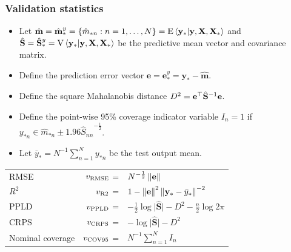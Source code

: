 \documentclass{snedecorbeamer}
\begin{document}
\begin{frame}%
  \label{frm:validation}
  \frametitle{Validation statistics}

  \newcommand{\predmean}{\hat{\mathbf{m}}^{y}_*}
  \newcommand{\predvar}{\hat{\mathbf{S}}^{y}_*}
  \newcommand{\postpred}{\hat{p}^{y}_*}

  \begin{itemize}
  \item   Let
    $\hat{\mathbf{m}} = \predmean = \{\hat{m}_{*n}: n = 1, \dots, N\} =
    \EV{\mathbf{y}_* | \mathbf{y}, \mathbf{X}, \mathbf{X}_*}$
    and
    $\hat{\mathbf{S}} = \predvar = \VV{\mathbf{y}_* |
      \mathbf{y}, \mathbf{X}, \mathbf{X}_*}$
    be the predictive mean vector and covariance matrix.
  \item  Define the
    prediction error vector $\mathbf{e} = \mathbf{e}_{*}^{y} =
    \mathbf{y}_{*} - \hat{\mathbf{m}}$.
  \item Define the square Mahalanobis distance $D^2
    = \mathbf{e}^{\top} \hat{\mathbf{S}}^{-1} \mathbf{e}$.
  \item Define the point-wise 95\% coverage indicator variable
    $I_{n} = 1$ if $y_{*n} \in \hat{m}_{*n} \pm 1.96
    {\hat{S}_{nn}}^{-\frac{1}{2}}$.
  \item   Let $\bar{y}_* = N^{-1} \sum_{n=1}^{N} y_{*n}$ be the test output
    mean.
  \end{itemize}

  \begin{center}
    \begin{tabular}{lrl}
      RMSE
      & $v_{\textsc{RMSE}}$ =
      & $N^{-\frac{1}{2}} \left\lVert\mathbf{e}\right\rVert$ \\
      $R^2$
      & $v_{\textsc{R2}} $ =
      & $1 -%
        \norm{\mathbf{e}}^{2}
        \norm{\mathbf{y}_* - \bar{y}_*}^{-2}$ \\
      PPLD
      & $v_{\textsc{PPLD}}$ =
      & $
        -\frac{1}{2} \log \lvert \hat{\mathbf{S}} \rvert
        -D^2
        -\frac{n}{2} \log 2 \pi
        $
      \\
      CRPS
      & $v_{\textsc{CRPS}}$ =
      & $
        -\log \lvert \hat{\mathbf{S}} \rvert%
        -D^2
        $
      \\
      Nominal coverage
      & $v_{\textsc{COV95}}$ =
      & $N^{-1} \sum_{n = 1}^{N} I_{n}$
    \end{tabular}
  \end{center}
\end{frame}
\end{document}
